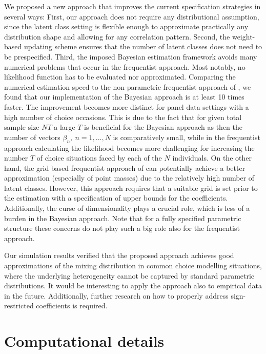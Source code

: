 \documentclass[article]{jss}
\begin{document}
We proposed a new approach that improves the current specification strategies in several ways: First, our approach does not require any distributional assumption, since the latent class setting is flexible enough to approximate practically any distribution shape and allowing for any correlation pattern. Second, the weight-based updating scheme ensures that the number of latent classes does not need to be prespecified. Third, the imposed Bayesian estimation framework avoids many numerical problems that occur in the frequentist approach. Most notably, no likelihood function has to be evaluated nor approximated. Comparing the numerical estimation speed to the non-parametric frequentist approach of \cite{Bauer:2019}, we found that our implementation of the Bayesian approach is at least 10 times faster. The improvement becomes more distinct for panel data settings with a high number of choice occasions. This is due to the fact that for given total sample size $NT$ a large $T$ is beneficial for the Bayesian approach as then the number of vectors $\beta_n,~ n = 1,...,N$ is comparatively small, while in the frequentist approach calculating the likelihood becomes more challenging for increasing the number $T$ of choice situations faced by each of the $N$ individuals. On the other hand, the grid based frequentist approach of \cite{Bauer:2019} can potentially achieve a better approximation (especially of point masses) due to the relatively high number of latent classes. However, this approach requires that a suitable grid is set prior to the estimation with a specification of upper bounds for the coefficients. Additionally, the curse of dimensionality plays a crucial role, which is less of a burden in the Bayesian approach. Note that for a fully specified parametric structure these concerns do not play such a big role also for the frequentist approach.

Our simulation results verified that the proposed approach achieves good approximations of the mixing distribution in common choice modelling situations, where the underlying heterogeneity cannot be captured by standard parametric distributions. It would be interesting to apply the approach also to empirical data in the future. Additionally,
further research on how to properly address sign-restricted coefficients is required.


\section*{Computational details}
\end{document}
